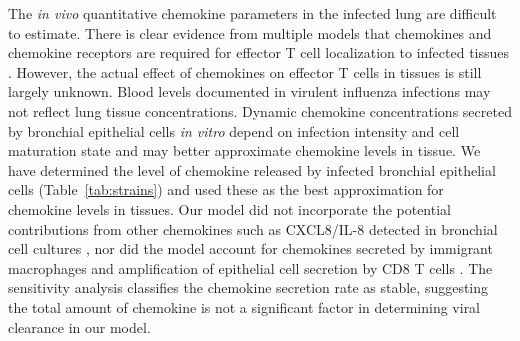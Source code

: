 \documentclass[10pt]{article}
\begin{document}

The \textit{in vivo} quantitative chemokine parameters in the infected lung are difficult to estimate.  There is clear evidence from multiple models that chemokines and chemokine receptors are required for effector T cell localization to infected tissues \cite{Christensen2004, Christensen2006, Dawson2000, DeLemos2005, Fadel2008, Gadhamsetty2014, Groom2011a, Groom2011, Hsieh2006, Klein2005, Kohlmeier2009, Kohlmeier2011, Thapa2008, Wareing2004, Wuest2008, Pawelek2012}. However, the actual effect of chemokines on effector T cells in tissues is still largely unknown.  Blood levels documented in virulent influenza infections \cite{DeJong2006} may not reflect lung tissue concentrations.  Dynamic chemokine concentrations secreted by bronchial epithelial cells \textit{in vitro} depend on infection intensity and cell maturation state \cite{Mitchell2011, Chan2010, Chan2005, Zeng2011} and may better approximate chemokine levels in tissue.  We have determined the level of chemokine released by infected bronchial epithelial cells (Table~\ref{tab:strains}) and used these as the best approximation for chemokine levels in tissues.  Our model did not incorporate the potential contributions from other chemokines such as CXCL8/IL-8 detected in bronchial cell cultures \cite{Matsukura1996, Arndt2002}, nor did the model account for chemokines secreted by immigrant macrophages \cite{Julkunen2000} and amplification of epithelial cell secretion by CD8 T cells \cite{Zhao2000}.  The sensitivity analysis classifies the chemokine secretion rate as stable, suggesting the total amount of chemokine is not a significant factor in determining viral clearance in our model.  
\end{document}

